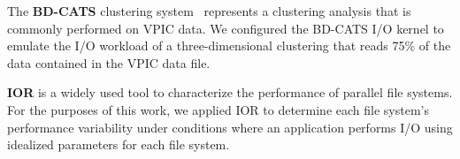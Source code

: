 The \textbf{BD-CATS} clustering system~\cite{Patwary2015} represents
a clustering analysis that is commonly performed on VPIC data.
We configured the BD-CATS I/O kernel to emulate the I/O workload of
a three-dimensional clustering that reads 75\% of the data
contained in the VPIC data file.

\textbf{IOR} is a widely used tool to characterize the performance of parallel file systems\cite{Yildiz2016,Xie2012,Lofstead2010,Uselton2010}.
For the purposes of this work, we applied IOR to determine each file system's performance variability under conditions where an application performs I/O using idealized parameters for each file system.


